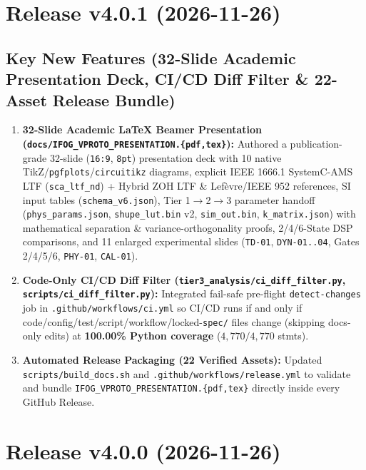 \documentclass[11pt,a4paper]{article}
\begin{document}
\section{Release v4.0.1 (2026-11-26)}

\subsection{Key New Features (32-Slide Academic Presentation Deck, CI/CD Diff Filter \& 22-Asset Release Bundle)}
\begin{enumerate}
    \item \textbf{32-Slide Academic LaTeX Beamer Presentation (\texttt{docs/IFOG\_VPROTO\_PRESENTATION.\{pdf,tex\}}):}
    Authored a publication-grade 32-slide (\texttt{16:9}, \texttt{8pt}) presentation deck with 10 native TikZ/\texttt{pgfplots}/\texttt{circuitikz} diagrams, explicit IEEE 1666.1 SystemC-AMS LTF (\texttt{sca\_ltf\_nd}) + Hybrid ZOH LTF \& Lefèvre/IEEE 952 references, SI input tables (\texttt{schema\_v6.json}), Tier 1$\to$2$\to$3 parameter handoff (\texttt{phys\_params.json}, \texttt{shupe\_lut.bin} v2, \texttt{sim\_out.bin}, \texttt{k\_matrix.json}) with mathematical separation \& variance-orthogonality proofs, 2/4/6-State DSP comparisons, and 11 enlarged experimental slides (\texttt{TD-01}, \texttt{DYN-01..04}, Gates 2/4/5/6, \texttt{PHY-01}, \texttt{CAL-01}).
    \item \textbf{Code-Only CI/CD Diff Filter (\texttt{tier3\_analysis/ci\_diff\_filter.py}, \texttt{scripts/ci\_diff\_filter.py}):}
    Integrated fail-safe pre-flight \texttt{detect-changes} job in \texttt{.github/workflows/ci.yml} so CI/CD runs if and only if code/config/test/script/workflow/locked-\texttt{spec/} files change (skipping docs-only edits) at \textbf{100.00\% Python coverage} ($4{,}770/4{,}770$ stmts).
    \item \textbf{Automated Release Packaging (22 Verified Assets):}
    Updated \texttt{scripts/build\_docs.sh} and \texttt{.github/workflows/release.yml} to validate and bundle \texttt{IFOG\_VPROTO\_PRESENTATION.\{pdf,tex\}} directly inside every GitHub Release.
\end{enumerate}

\section{Release v4.0.0 (2026-11-26)}
\end{document}
